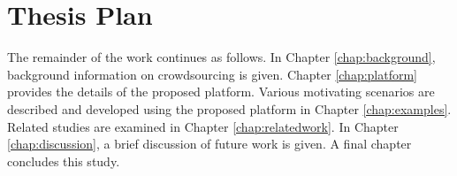 
\section{Thesis Plan}

The remainder of the work continues as follows. In Chapter \ref{chap:background}, 
background information on crowdsourcing is given. Chapter \ref{chap:platform} provides 
the details of the proposed platform. Various motivating scenarios are described and 
developed using the proposed platform in Chapter 
\ref{chap:examples}. Related studies are examined in Chapter \ref{chap:relatedwork}. In Chapter \ref{chap:discussion}, a brief discussion of future work 
is given. A final chapter concludes this study.
